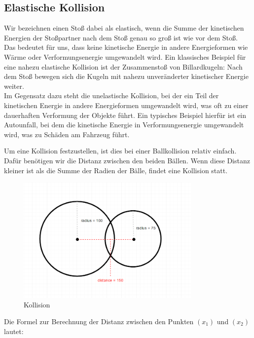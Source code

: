 \documentclass[12pt,a4paper]{article}
\begin{document}
	\subsection{Elastische Kollision}	
	Wir bezeichnen einen Stoß dabei als elastisch, wenn die Summe der kinetischen Energien der Stoßpartner nach dem Stoß genau so groß ist wie vor dem Stoß. \cite{leifiphysik1}~ \\
	Das bedeutet für uns, dass keine kinetische Energie in andere Energieformen wie Wärme oder Verformungsenergie umgewandelt wird. Ein klassisches Beispiel für eine nahezu elastische Kollision ist der Zusammenstoß von Billardkugeln: Nach dem Stoß bewegen sich die Kugeln mit nahezu unveränderter kinetischer Energie weiter.\\ Im Gegensatz dazu steht die unelastische Kollision, bei der ein Teil der kinetischen Energie in andere Energieformen umgewandelt wird, was oft zu einer dauerhaften Verformung der Objekte führt. Ein typisches Beispiel hierfür ist ein Autounfall, bei dem die kinetische Energie in Verformungsenergie umgewandelt wird, was zu Schäden am Fahrzeug führt.
	
	\vspace{0.5cm}
	
Um eine Kollision festzustellen, ist dies bei einer Ballkollision relativ einfach. Dafür benötigen wir die Distanz zwischen den beiden Bällen. Wenn diese Distanz kleiner ist als die Summe der Radien der Bälle, findet eine Kollision statt.

\begin{figure}[H]
	\centering 
	\includegraphics[width=0.8\textwidth]{collision-detection-6.png}  
	\caption{Kollision  \cite{happycoding}} 
	\label{Bild: Kollision}  
\end{figure}


Die Formel zur Berechnung der Distanz zwischen den Punkten \( (x_1) \) und \( (x_2) \) lautet:
\end{document}
